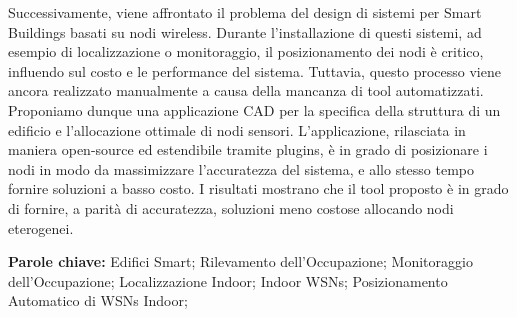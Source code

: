Successivamente, viene affrontato il problema del design di sistemi per Smart Buildings basati su nodi wireless. Durante l'installazione di questi sistemi, ad esempio di localizzazione o monitoraggio, il posizionamento dei nodi è critico, influendo sul costo e le performance del sistema. Tuttavia, questo processo viene ancora realizzato manualmente a causa della mancanza di tool automatizzati.\\
Proponiamo dunque una applicazione CAD per la specifica della struttura di un edificio e l'allocazione ottimale di nodi sensori. L'applicazione, rilasciata in maniera open-source ed estendibile tramite plugins, è in grado di posizionare i nodi in modo da massimizzare l'accuratezza del sistema, e allo stesso tempo fornire soluzioni a basso costo.
I risultati mostrano che il tool proposto è in grado di fornire, a parità di accuratezza, soluzioni meno costose allocando nodi eterogenei.

\medskip
%
\noindent \textbf{Parole chiave:} 
Edifici Smart; Rilevamento dell'Occupazione; Monitoraggio dell'Occupazione; Localizzazione Indoor; Indoor WSNs; Posizionamento Automatico di WSNs Indoor;
%


